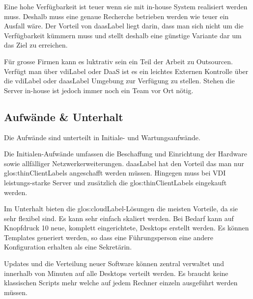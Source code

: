 Eine hohe Verfügbarkeit ist teuer wenn sie mit in-house System realisiert werden muss. Deshalb muss eine genaue Recherche betrieben werden wie teuer ein Ausfall wäre. Der Vorteil von \Gls{daasLabel} liegt darin, dass man sich nicht um die Verfügbarkeit kümmern muss und stellt deshalb eine günstige Variante dar um das Ziel zu erreichen.

Für grosse Firmen kann es luktrativ sein ein Teil der Arbeit zu Outsourcen. Verfügt man über \Gls{vdiLabel} oder DaaS ist es ein leichtes Externen Kontrolle über die \Gls{vdiLabel} oder \Gls{daasLabel} Umgebung zur Verfügung zu stellen. Stehen die Server in-house ist jedoch immer noch ein Team vor Ort nötig.

\subsection{Aufwände \& Unterhalt}




Die Aufwände sind unterteilt in Initiale- und Wartungsaufwände.

Die Initialen-Aufwände umfassen die Beschaffung und Einrichtung der Hardware sowie allfälliger Netzwerkerweiterungen. \Gls{daasLabel} hat den Vorteil das man nur \glspl{glos:thinClientLabel} angeschafft werden müssen. Hingegen muss bei VDI leistungs-starke Server und zusätzlich die \glspl{glos:thinClientLabel} eingekauft werden.

Im Unterhalt bieten die \Gls{glos:cloudLabel}-Lösungen die meisten Vorteile, da sie sehr flexibel sind. Es kann sehr einfach skaliert werden. Bei Bedarf kann auf Knopfdruck 10 neue, komplett eingerichtete,  Desktops erstellt werden. Es können Templates generiert werden, so dass eine Führungsperson eine andere Konfiguration erhalten als eine Sekretärin.

Updates und die Verteilung neuer Software können zentral verwaltet und innerhalb von Minuten auf alle Desktops verteilt werden. Es braucht keine klassischen Scripts mehr welche auf jedem Rechner einzeln ausgeführt werden müssen.

